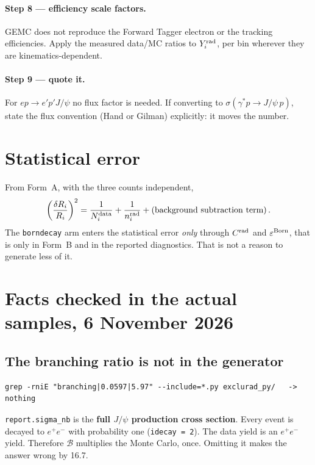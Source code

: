\documentclass[11pt]{article}
\newcommand{\crad}{C^{\rm rad}}
\newcommand{\BR}{\mathcal{B}}
\begin{document}
\paragraph{Step 8 --- efficiency scale factors.}
GEMC does not reproduce the Forward Tagger electron or the tracking efficiencies. Apply the measured
data/MC ratios to $Y_i^{\rm rad}$, per bin wherever they are kinematics-dependent.

\paragraph{Step 9 --- quote it.}
For $ep\to e'p'J/\psi$ no flux factor is needed. If converting to
$\sigma(\gamma^*p\to J/\psi\,p)$, state the flux convention (Hand or Gilman) explicitly: it moves
the number.

\section{Statistical error}

From Form~A, with the three counts independent,
\begin{equation}
\left(\frac{\delta R_i}{R_i}\right)^{2}
=\frac{1}{N_i^{\rm data}}+\frac{1}{n_i^{\rm rad}}
+\left(\text{background subtraction term}\right).
\end{equation}
The \texttt{borndecay} arm enters the statistical error \emph{only} through $\crad$ and
$\varepsilon^{\rm Born}$, that is only in Form~B and in the reported diagnostics. That is not a
reason to generate less of it.

\section{Facts checked in the actual samples, 6 November 2026}

\subsection{The branching ratio is not in the generator}

\begin{verbatim}
grep -rniE "branching|0.0597|5.97" --include=*.py exclurad_py/   ->   nothing
\end{verbatim}
\texttt{report.sigma\_nb} is the \textbf{full $J/\psi$ production cross section}. Every event is
decayed to $e^+e^-$ with probability one (\texttt{idecay = 2}). The data yield is an $e^+e^-$ yield.
Therefore $\BR$ multiplies the Monte Carlo, once. Omitting it makes the answer wrong by 16.7.
\end{document}
